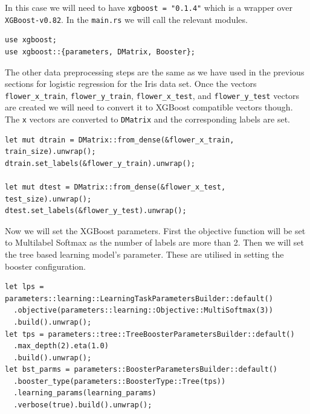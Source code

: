 \documentclass{book}
\begin{document}
In this case we will need to have \lstinline{xgboost = "0.1.4"} which is a wrapper over \lstinline{XGBoost-v0.82}. In the \lstinline{main.rs} we will call the relevant modules.

\begin{lstlisting}[caption={chapter3\\/iris\_classification\_xgboost\\/src\\/main\\.rs}]
use xgboost;
use xgboost::{parameters, DMatrix, Booster};
\end{lstlisting}

The other data preprocessing steps are the same as we have used in the previous sections for logistic regression for the Iris data set. Once the vectors \lstinline{flower_x_train}, \lstinline{flower_y_train}, \lstinline{flower_x_test}, and \lstinline{flower_y_test} vectors are created we will need to convert it to XGBoost compatible vectors though. The \lstinline{x} vectors are converted to \lstinline{DMatrix} and the corresponding labels are set.

\begin{lstlisting}[caption={chapter3\\/iris\_classification\_xgboost\\/src\\/main\\.rs}]
let mut dtrain = DMatrix::from_dense(&flower_x_train, train_size).unwrap();
dtrain.set_labels(&flower_y_train).unwrap();

let mut dtest = DMatrix::from_dense(&flower_x_test, test_size).unwrap();
dtest.set_labels(&flower_y_test).unwrap();
\end{lstlisting}

Now we will set the XGBoost parameters. First the objective function will be set to Multilabel Softmax as the number of labels are more than 2.  Then we will set the tree based learning model's parameter. These are utilised in setting the booster configuration.

\begin{lstlisting}[caption={chapter3\\/iris\_classification\_xgboost\\/src\\/main\\.rs}]
let lps = parameters::learning::LearningTaskParametersBuilder::default()
  .objective(parameters::learning::Objective::MultiSoftmax(3))
  .build().unwrap();
let tps = parameters::tree::TreeBoosterParametersBuilder::default()
  .max_depth(2).eta(1.0)
  .build().unwrap();
let bst_parms = parameters::BoosterParametersBuilder::default()
  .booster_type(parameters::BoosterType::Tree(tps))
  .learning_params(learning_params)
  .verbose(true).build().unwrap();
\end{lstlisting}
\end{document}
